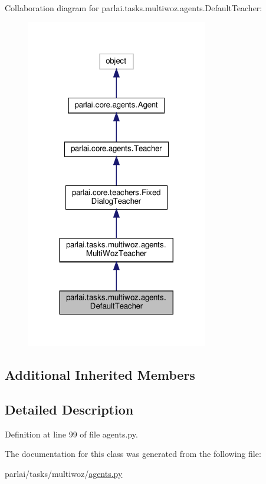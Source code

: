 Collaboration diagram for parlai.\+tasks.\+multiwoz.\+agents.\+Default\+Teacher\+:\nopagebreak
\begin{figure}[H]
\begin{center}
\leavevmode
\includegraphics[width=224pt]{d8/d97/classparlai_1_1tasks_1_1multiwoz_1_1agents_1_1DefaultTeacher__coll__graph}
\end{center}
\end{figure}
\subsection*{Additional Inherited Members}


\subsection{Detailed Description}


Definition at line 99 of file agents.\+py.



The documentation for this class was generated from the following file\+:\begin{DoxyCompactItemize}
\item 
parlai/tasks/multiwoz/\hyperlink{parlai_2tasks_2multiwoz_2agents_8py}{agents.\+py}\end{DoxyCompactItemize}
